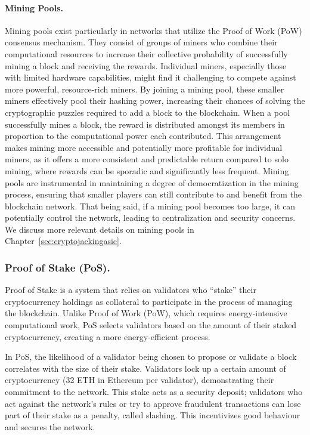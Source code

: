\paragraph{Mining Pools.}
Mining pools exist particularly in networks that utilize the Proof of Work (PoW) consensus mechanism. They consist of groups of miners who combine their computational resources to increase their collective probability of successfully mining a block and receiving the rewards. Individual miners, especially those with limited hardware capabilities, might find it challenging to compete against more powerful, resource-rich miners. By joining a mining pool, these smaller miners effectively pool their hashing power, increasing their chances of solving the cryptographic puzzles required to add a block to the blockchain. When a pool successfully mines a block, the reward is distributed amongst its members in proportion to the computational power each contributed. This arrangement makes mining more accessible and potentially more profitable for individual miners, as it offers a more consistent and predictable return compared to solo mining, where rewards can be sporadic and significantly less frequent. Mining pools are instrumental in maintaining a degree of democratization in the mining process, ensuring that smaller players can still contribute to and benefit from the blockchain network. That being said, if a mining pool becomes too large, it can potentially control the network, leading to centralization and security concerns. We discuss more relevant details on mining pools in Chapter~\ref{sec:cryptojackingasic}.



\subsubsection{Proof of Stake (PoS).}
Proof of Stake is a system that relies on validators who ``stake'' their cryptocurrency holdings as collateral to participate in the process of managing the blockchain. Unlike Proof of Work (PoW), which requires energy-intensive computational work, PoS selects validators based on the amount of their staked cryptocurrency, creating a more energy-efficient process.

In PoS, the likelihood of a validator being chosen to propose or validate a block correlates with the size of their stake. Validators lock up a certain amount of cryptocurrency (32 ETH in Ethereum per validator), demonstrating their commitment to the network. This stake acts as a security deposit; validators who act against the network's rules or try to approve fraudulent transactions can lose part of their stake as a penalty, called slashing. This incentivizes good behaviour and secures the network. 

